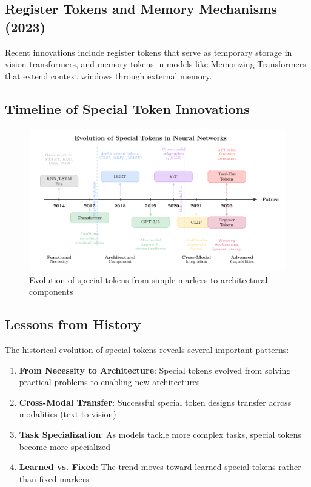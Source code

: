 \subsection{Register Tokens and Memory Mechanisms (2023)}

Recent innovations include register tokens \citep{darcet2023vision} that serve as temporary storage in vision transformers, and memory tokens in models like Memorizing Transformers \citep{wu2022memorizing} that extend context windows through external memory.

\subsection{Timeline of Special Token Innovations}

\begin{figure}[h]
\centering
\includegraphics[width=\textwidth]{part1/chapter01/fig_timeline}
\caption{Evolution of special tokens from simple markers to architectural components}
\end{figure}

\subsection{Lessons from History}

The historical evolution of special tokens reveals several important patterns:

\begin{principle}
\begin{enumerate}
\item \textbf{From Necessity to Architecture}: Special tokens evolved from solving practical problems to enabling new architectures
\item \textbf{Cross-Modal Transfer}: Successful special token designs transfer across modalities (text to vision)
\item \textbf{Task Specialization}: As models tackle more complex tasks, special tokens become more specialized
\item \textbf{Learned vs. Fixed}: The trend moves toward learned special tokens rather than fixed markers
\end{enumerate}
\end{principle}

